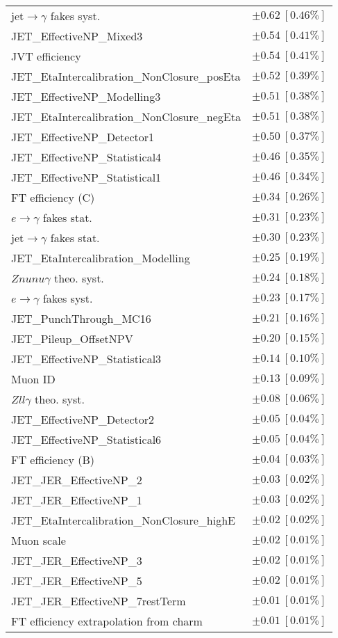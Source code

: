 \begin{tabular}{lr}
jet$\to\gamma$ fakes syst. & $\pm 0.62\ [0.46\%]$ \\
JET\_EffectiveNP\_Mixed3 & $\pm 0.54\ [0.41\%]$ \\
JVT efficiency & $\pm 0.54\ [0.41\%]$ \\
JET\_EtaIntercalibration\_NonClosure\_posEta & $\pm 0.52\ [0.39\%]$ \\
JET\_EffectiveNP\_Modelling3 & $\pm 0.51\ [0.38\%]$ \\
JET\_EtaIntercalibration\_NonClosure\_negEta & $\pm 0.51\ [0.38\%]$ \\
JET\_EffectiveNP\_Detector1 & $\pm 0.50\ [0.37\%]$ \\
JET\_EffectiveNP\_Statistical4 & $\pm 0.46\ [0.35\%]$ \\
JET\_EffectiveNP\_Statistical1 & $\pm 0.46\ [0.34\%]$ \\
FT efficiency (C) & $\pm 0.34\ [0.26\%]$ \\
$e\to\gamma$ fakes stat. & $\pm 0.31\ [0.23\%]$ \\
jet$\to\gamma$ fakes stat. & $\pm 0.30\ [0.23\%]$ \\
JET\_EtaIntercalibration\_Modelling & $\pm 0.25\ [0.19\%]$ \\
$Znunu\gamma$ theo. syst. & $\pm 0.24\ [0.18\%]$ \\
$e\to\gamma$ fakes syst. & $\pm 0.23\ [0.17\%]$ \\
JET\_PunchThrough\_MC16 & $\pm 0.21\ [0.16\%]$ \\
JET\_Pileup\_OffsetNPV & $\pm 0.20\ [0.15\%]$ \\
JET\_EffectiveNP\_Statistical3 & $\pm 0.14\ [0.10\%]$ \\
Muon ID & $\pm 0.13\ [0.09\%]$ \\
$Zll\gamma$ theo. syst. & $\pm 0.08\ [0.06\%]$ \\
JET\_EffectiveNP\_Detector2 & $\pm 0.05\ [0.04\%]$ \\
JET\_EffectiveNP\_Statistical6 & $\pm 0.05\ [0.04\%]$ \\
FT efficiency (B) & $\pm 0.04\ [0.03\%]$ \\
JET\_JER\_EffectiveNP\_2 & $\pm 0.03\ [0.02\%]$ \\
JET\_JER\_EffectiveNP\_1 & $\pm 0.03\ [0.02\%]$ \\
JET\_EtaIntercalibration\_NonClosure\_highE & $\pm 0.02\ [0.02\%]$ \\
Muon scale & $\pm 0.02\ [0.01\%]$ \\
JET\_JER\_EffectiveNP\_3 & $\pm 0.02\ [0.01\%]$ \\
JET\_JER\_EffectiveNP\_5 & $\pm 0.02\ [0.01\%]$ \\
JET\_JER\_EffectiveNP\_7restTerm & $\pm 0.01\ [0.01\%]$ \\
FT efficiency extrapolation from charm & $\pm 0.01\ [0.01\%]$ \\
\hline
\end{tabular}
